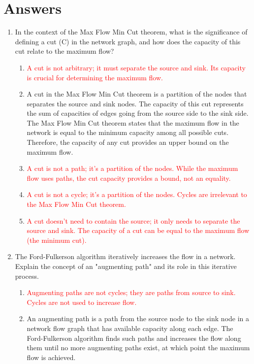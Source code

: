 \documentclass{article}%
\newcommand{\incorrect}[1]{\textcolor{red}{#1}}
\begin{document}
\section{Answers}%
\label{sec:Answers}%
\begin{enumerate}%
\item In the context of the Max Flow Min Cut theorem, what is the significance of defining a cut (C) in the network graph, and how does the capacity of this cut relate to the maximum flow?%
\begin{enumerate}%
\item \incorrect{A cut is not arbitrary; it must separate the source and sink. Its capacity is crucial for determining the maximum flow.}%
\item A cut in the Max Flow Min Cut theorem is a partition of the nodes that separates the source and sink nodes. The capacity of this cut represents the sum of capacities of edges going from the source side to the sink side.  The Max Flow Min Cut theorem states that the maximum flow in the network is equal to the minimum capacity among all possible cuts. Therefore, the capacity of any cut provides an upper bound on the maximum flow.%
\item \incorrect{A cut is not a path; it's a partition of the nodes.  While the maximum flow uses paths, the cut capacity provides a bound, not an equality.}%
\item \incorrect{A cut is not a cycle; it's a partition of the nodes. Cycles are irrelevant to the Max Flow Min Cut theorem.}%
\item \incorrect{A cut doesn't need to contain the source; it only needs to separate the source and sink. The capacity of a cut can be equal to the maximum flow (the minimum cut).}%
\end{enumerate}%
\vspace{1em}%
\item The Ford-Fulkerson algorithm iteratively increases the flow in a network.  Explain the concept of an "augmenting path" and its role in this iterative process.%
\begin{enumerate}%
\item \incorrect{Augmenting paths are not cycles; they are paths from source to sink.  Cycles are not used to increase flow.}%
\item An augmenting path is a path from the source node to the sink node in a network flow graph that has available capacity along each edge.  The Ford-Fulkerson algorithm finds such paths and increases the flow along them until no more augmenting paths exist, at which point the maximum flow is achieved.%

\end{enumerate}
\end{enumerate}
\end{document}
